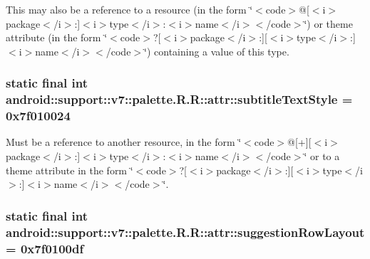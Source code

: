 This may also be a reference to a resource (in the form \char`\"{}$<$code$>$@\mbox{[}$<$i$>$package$<$/i$>$:\mbox{]}$<$i$>$type$<$/i$>$:$<$i$>$name$<$/i$>$$<$/code$>$\char`\"{}) or theme attribute (in the form \char`\"{}$<$code$>$?\mbox{[}$<$i$>$package$<$/i$>$:\mbox{]}\mbox{[}$<$i$>$type$<$/i$>$:\mbox{]}$<$i$>$name$<$/i$>$$<$/code$>$\char`\"{}) containing a value of this type. \hypertarget{classandroid_1_1support_1_1v7_1_1palette_1_1_r_1_1attr_d9445f34a7e928161b8c5b0fda448829}{
\subsubsection[{subtitleTextStyle}]{\setlength{\rightskip}{0pt plus 5cm}static final int android::support::v7::palette.R.R::attr::subtitleTextStyle = 0x7f010024}}
\label{classandroid_1_1support_1_1v7_1_1palette_1_1_r_1_1attr_d9445f34a7e928161b8c5b0fda448829}


Must be a reference to another resource, in the form \char`\"{}$<$code$>$@\mbox{[}+\mbox{]}\mbox{[}$<$i$>$package$<$/i$>$:\mbox{]}$<$i$>$type$<$/i$>$:$<$i$>$name$<$/i$>$$<$/code$>$\char`\"{} or to a theme attribute in the form \char`\"{}$<$code$>$?\mbox{[}$<$i$>$package$<$/i$>$:\mbox{]}\mbox{[}$<$i$>$type$<$/i$>$:\mbox{]}$<$i$>$name$<$/i$>$$<$/code$>$\char`\"{}. \hypertarget{classandroid_1_1support_1_1v7_1_1palette_1_1_r_1_1attr_8d4295d373b13864b9103a0651ee775a}{
\subsubsection[{suggestionRowLayout}]{\setlength{\rightskip}{0pt plus 5cm}static final int android::support::v7::palette.R.R::attr::suggestionRowLayout = 0x7f0100df}}
\label{classandroid_1_1support_1_1v7_1_1palette_1_1_r_1_1attr_8d4295d373b13864b9103a0651ee775a}


